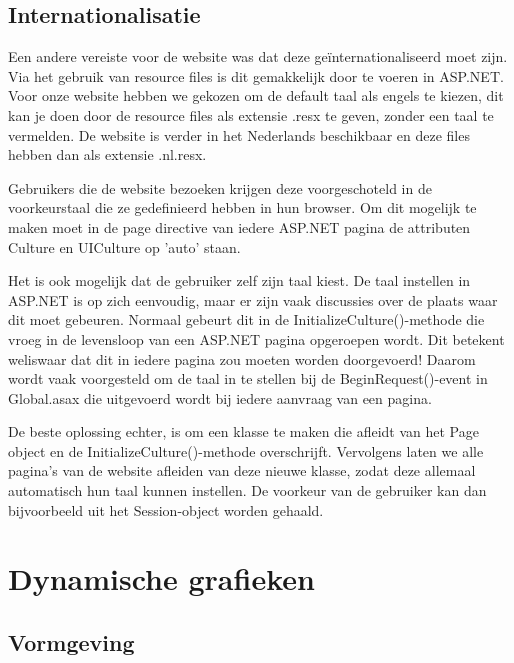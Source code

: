 \section{Internationalisatie}

Een andere vereiste voor de website was dat deze ge\"internationaliseerd moet zijn. Via het gebruik van resource files is dit gemakkelijk door te voeren in ASP.NET. Voor onze website hebben we gekozen om de default taal als engels te kiezen, dit kan je doen door de resource files als extensie .resx te geven, zonder een taal te vermelden. De website is verder in het Nederlands beschikbaar en deze files hebben dan als extensie .nl.resx.

Gebruikers die de website bezoeken krijgen deze voorgeschoteld in de voorkeurstaal die ze gedefinieerd hebben in hun browser. Om dit mogelijk te maken moet in de page directive van iedere ASP.NET pagina de attributen Culture en UICulture op 'auto' staan.

Het is ook mogelijk dat de gebruiker zelf zijn taal kiest. De taal instellen in ASP.NET is op zich eenvoudig, maar er zijn vaak discussies over de plaats waar dit moet gebeuren. Normaal gebeurt dit in de InitializeCulture()-methode die vroeg in de levensloop van een ASP.NET pagina opgeroepen wordt. Dit betekent weliswaar dat dit in iedere pagina zou moeten worden doorgevoerd! Daarom wordt vaak voorgesteld om de taal in te stellen bij de BeginRequest()-event in Global.asax die uitgevoerd wordt bij iedere aanvraag van een pagina.

De beste oplossing echter, is om een klasse te maken die afleidt van het Page object en de InitializeCulture()-methode overschrijft. Vervolgens laten we alle pagina's van de website afleiden van deze nieuwe klasse, zodat deze allemaal automatisch hun taal kunnen instellen. De voorkeur van de gebruiker kan dan bijvoorbeeld uit het Session-object worden gehaald.

%
%

\chapter{Dynamische grafieken}

\section{Vormgeving}

